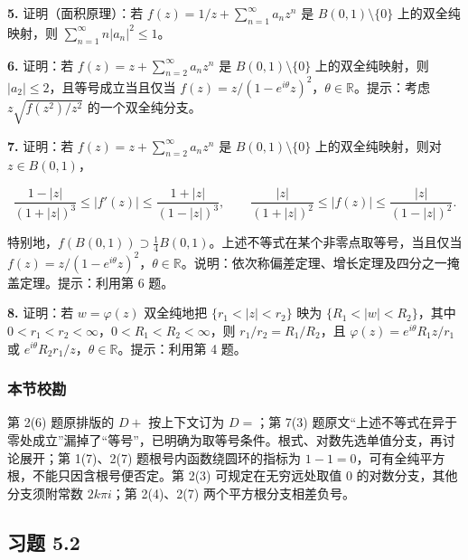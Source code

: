 \documentclass[11pt,a4paper]{article}
\begin{document}
\par{}
\noindent\textbf{5.} 证明（面积原理）：若 \(f(z)=1/z+\sum_{n=1}^\infty a_nz^n\)
是 \(B(0,1)\setminus\{0\}\) 上的双全纯映射，则
\(\sum_{n=1}^\infty n|a_n|^2\le1\)。

\par{}
\noindent\textbf{6.} 证明：若 \(f(z)=z+\sum_{n=2}^\infty a_nz^n\) 是
\(B(0,1)\setminus\{0\}\) 上的双全纯映射，则
\(|a_2|\le2\)，且等号成立当且仅当
\(f(z)=z/(1-e^{i\theta}z)^2\)，\(\theta\in\mathbb R\)。提示：考虑
\(z\sqrt{f(z^2)/z^2}\) 的一个双全纯分支。

\par{}
\noindent\textbf{7.} 证明：若 \(f(z)=z+\sum_{n=2}^\infty a_nz^n\) 是
\(B(0,1)\setminus\{0\}\) 上的双全纯映射，则对 \(z\in B(0,1)\)，

\[
\frac{1-|z|}{(1+|z|)^3}\le|f'(z)|\le\frac{1+|z|}{(1-|z|)^3},\qquad
\frac{|z|}{(1+|z|)^2}\le|f(z)|\le\frac{|z|}{(1-|z|)^2}.
\]

特别地，\(f(B(0,1))\supset\tfrac14B(0,1)\)。上述不等式在某个非零点取等号，当且仅当
\(f(z)=z/(1-e^{i\theta}z)^2\)，\(\theta\in\mathbb R\)。说明：依次称偏差定理、增长定理及四分之一掩盖定理。提示：利用第
6 题。

\par{}
\noindent\textbf{8.} 证明：若 \(w=\varphi(z)\) 双全纯地把 \(\{r_1<|z|<r_2\}\)
映为 \(\{R_1<|w|<R_2\}\)，其中
\(0<r_1<r_2<\infty\)，\(0<R_1<R_2<\infty\)，则 \(r_1/r_2=R_1/R_2\)，且
\(\varphi(z)=e^{i\theta}R_1z/r_1\) 或
\(e^{i\theta}R_2r_1/z\)，\(\theta\in\mathbb R\)。提示：利用第 4 题。

\subsubsection{本节校勘}\label{ch05-practice-ux672cux8282ux6821ux52d8}

第 2(6) 题原排版的 \(D+\) 按上下文订为 \(D=\)；第 7(3)
题原文``上述不等式在异于零处成立''漏掉了``等号''，已明确为取等号条件。根式、对数先选单值分支，再讨论展开；第
1(7)、2(7) 题根号内函数绕圆环的指标为
\(1-1=0\)，可有全纯平方根，不能只因含根号便否定。第 2(3)
可规定在无穷远处取值 \(0\) 的对数分支，其他分支须附常数 \(2k\pi i\)；第
2(4)、2(7) 两个平方根分支相差负号。

\subsection{习题 5.2}\label{ch05-practice-heading-2}
\end{document}

